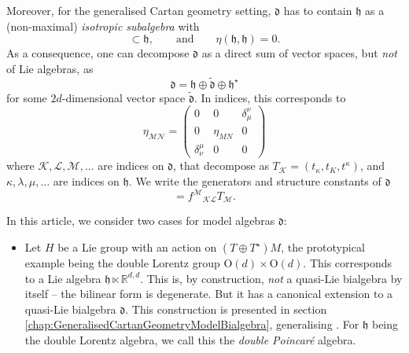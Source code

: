 \documentclass[11pt,a4paper]{article}
\numberwithin{equation}{section}
\begin{document}
\begin{enumerate}
\begin{itemize}
        Moreover, for the generalised Cartan geometry setting, $\mathfrak{d}$ has to contain $\mathfrak{h}$ as a (non-maximal) \textit{isotropic subalgebra} with 
        \begin{equation}
          [ \mathfrak{h} , \mathfrak{h} ] \subset \mathfrak{h}, \qquad \text{and} \qquad \eta(\mathfrak{h},\mathfrak{h}) = 0.
        \end{equation}
As a consequence, one can decompose $\mathfrak{d}$ as a direct sum of vector spaces, but \textit{not} of Lie algebras, as
\begin{equation}
	\mathfrak{d} = \mathfrak{h} \oplus \tilde{\mathfrak{d}} \oplus \mathfrak{h}^\star
\end{equation}
for some $2d$-dimensional vector space $\tilde{\mathfrak{d}}$. In indices, this corresponds to 
        \begin{equation}
	\eta_{\mathcal{M}\mathcal{N}} = \left( \begin{array}{ccc} 0 & 0 & \delta_\mu^\nu \\ 0 & \eta_{MN} & 0 \\ \delta_\nu^\mu & 0 & 0	\end{array} \right) \label{eq:GeneralisedMetricExtended}
\end{equation}
where $\mathcal{K},\mathcal{L},\mathcal{M},...$ are indices on $\mathfrak{d}$, that decompose as $T_\mathcal{K} = (t_\kappa , t_K , t^\kappa)$, and $\kappa,\lambda,\mu,...$ are indices on $\mathfrak{h}$. We write the generators and structure constants of $\mathfrak{d}$
\begin{equation}
	[ T_{\mathcal{K}} , T_{\mathcal{L}} ] = {f^{\mathcal{M}}}_{\mathcal{K} \mathcal{L}} T_{\mathcal{M}}.
\end{equation}

        In this article, we consider two cases for model algebras $\mathfrak{d}$:
\begin{itemize}
	\item Let $H$ be a Lie group with an action on $(T\oplus T^\star)M$, the prototypical example being the double Lorentz group O$(d)\times$O$(d)$. This corresponds to a Lie algebra $\mathfrak{h} \ltimes \mathbb{R}^{d,d}$. This is, by construction, \textit{not} a quasi-Lie bialgebra by itself -- the bilinear form is degenerate. But it has a canonical extension to a quasi-Lie bialgebra $\mathfrak{d}$. This construction is presented in section \ref{chap:GeneralisedCartanGeometryModelBialgebra}, generalising \cite{Polacek:2013nla}. For $\mathfrak{h}$ being the double Lorentz algebra, we call this the \textit{double Poincar\'e} algebra.


\end{itemize}
\end{itemize}
\end{enumerate}
\end{document}
